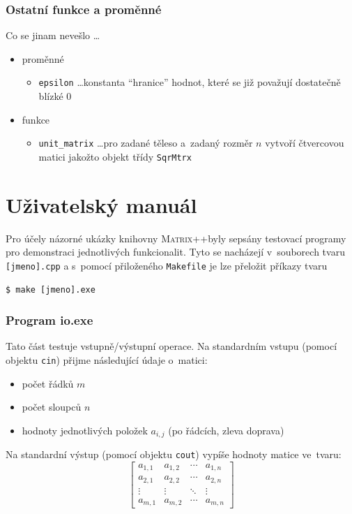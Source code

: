 \documentclass[11pt,a4paper]{article}
\newcommand{\mpp}{\textsc{Matrix++}}
\theoremstyle{remark}
\begin{document}
\section{Ostatní funkce a proměnné}

Co se jinam nevešlo \ldots

\begin{itemize}
\item proměnné
  \begin{itemize}
  \item \verb=epsilon= \ldots konstanta ``hranice'' hodnot, které se již
    považují dostatečně blízké $0$
  \end{itemize}
\item funkce
  \begin{itemize}
  \item \verb=unit_matrix= \ldots pro zadané těleso a~zadaný rozměr $n$ vytvoří
    čtvercovou matici jakožto objekt třídy \verb=SqrMtrx=
  \end{itemize}
\end{itemize}

\pagebreak

\part{Uživatelský manuál}
Pro účely názorné ukázky knihovny \mpp byly sepsány testovací programy pro
demonstraci jednotlivých funkcionalit.
Tyto se nacházejí v~souborech tvaru \verb=[jmeno].cpp= a s~pomocí přiloženého
\verb=Makefile= je lze přeložit příkazy tvaru
\begin{verbatim}
$ make [jmeno].exe
\end{verbatim}

\section{Program io.exe} \label{io.exe}

Tato část testuje vstupně/výstupní operace.
Na standardním vstupu (pomocí objektu \verb=cin=) přijme následující údaje
o~matici:
\begin{itemize}
\item počet řádků $m$
\item počet sloupců $n$
\item hodnoty jednotlivých položek $a_{i,j}$ (po řádcích, zleva doprava)
\end{itemize}
Na standardní výstup (pomocí objektu \verb=cout=) vypíše hodnoty matice
ve~tvaru:
\[
  \begin{bmatrix}
    a_{1,1} & a_{1,2} & \cdots & a_{1,n} \\
    a_{2,1} & a_{2,2} & \cdots & a_{2,n} \\
    \vdots  & \vdots  & \ddots & \vdots  \\
    a_{m,1} & a_{m,2} & \cdots & a_{m,n}
  \end{bmatrix}
\]
\end{document}
